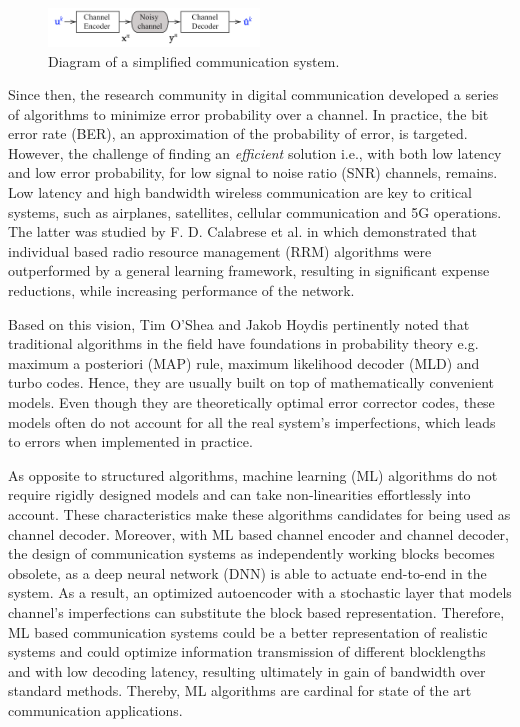 \documentclass[conference]{IEEEtran}
\begin{document}
\begin{figure}[!ht]
  \centering
    \includegraphics[width=0.5\textwidth]{simple_sys}
    \caption{Diagram of a simplified communication system.}\label{fig:cs}
\end{figure}

Since then, the research community in digital communication developed a series of algorithms to minimize error probability over a channel. In practice, the bit error rate (BER), an approximation of the probability of error, is targeted. However, the challenge of finding an \textit{efficient} solution  i.e., with both low latency and low error probability, for low signal to noise ratio (SNR) channels, remains. Low latency and high bandwidth wireless communication are key to critical systems, such as airplanes, satellites, cellular communication and 5G operations. The latter was studied by F. D. Calabrese et al. in \cite{DBLP:journals/corr/CalabreseWGPS16} which  demonstrated that individual based radio resource management (RRM) algorithms were outperformed by a general learning framework, resulting in significant expense reductions, while increasing performance of the network.

Based on this vision, Tim O'Shea and Jakob Hoydis \cite{DBLP:journals/corr/OSheaH17} pertinently noted that traditional algorithms in the field have foundations in probability theory e.g. maximum a posteriori (MAP) rule, maximum likelihood decoder (MLD) and turbo codes. Hence, they are usually built on top of mathematically convenient models. Even though they are theoretically optimal error corrector codes, these models often do not account for all the real system's imperfections, which leads to errors when implemented in practice.

As opposite to structured algorithms, machine learning (ML) algorithms do not require rigidly designed models and can take non-linearities effortlessly into account. These characteristics make these algorithms candidates for being used as channel decoder. Moreover, with ML based channel encoder and channel decoder, the design of communication systems as independently working blocks becomes obsolete, as a deep neural network (DNN) is able to actuate end-to-end in the system. As a result, an optimized autoencoder with a stochastic layer that models channel's imperfections can substitute the block based representation. Therefore, ML based communication systems could be a better representation of realistic systems and could optimize information transmission of different blocklengths and with low decoding latency, resulting ultimately in gain of bandwidth over standard methods. Thereby, ML algorithms are cardinal for state of the art communication applications. 
\end{document}
